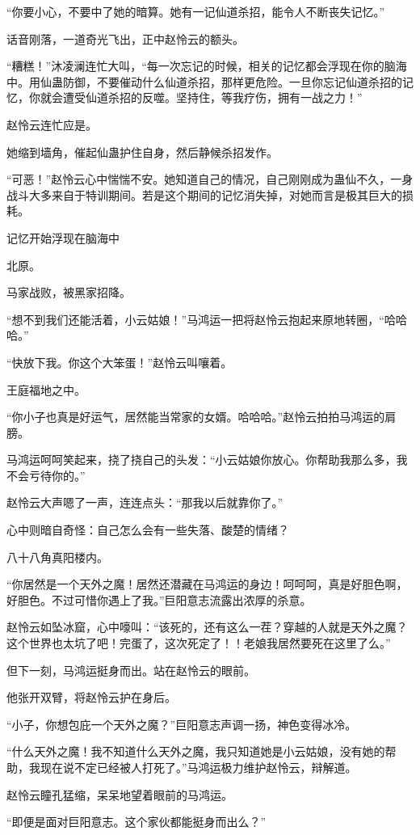 \begin{this_body}
“你要小心，不要中了她的暗算。她有一记仙道杀招，能令人不断丧失记忆。”

话音刚落，一道奇光飞出，正中赵怜云的额头。

“糟糕！”沐凌澜连忙大叫，“每一次忘记的时候，相关的记忆都会浮现在你的脑海中。用仙蛊防御，不要催动什么仙道杀招，那样更危险。一旦你忘记仙道杀招的记忆，你就会遭受仙道杀招的反噬。坚持住，等我疗伤，拥有一战之力！”

赵怜云连忙应是。

她缩到墙角，催起仙蛊护住自身，然后静候杀招发作。

“可恶！”赵怜云心中惴惴不安。她知道自己的情况，自己刚刚成为蛊仙不久，一身战斗大多来自于特训期间。若是这个期间的记忆消失掉，对她而言是极其巨大的损耗。

记忆开始浮现在脑海中

北原。

马家战败，被黑家招降。

“想不到我们还能活着，小云姑娘！”马鸿运一把将赵怜云抱起来原地转圈，“哈哈哈。”

“快放下我。你这个大笨蛋！”赵怜云叫嚷着。

王庭福地之中。

“你小子也真是好运气，居然能当常家的女婿。哈哈哈。”赵怜云拍拍马鸿运的肩膀。

马鸿运呵呵笑起来，挠了挠自己的头发：“小云姑娘你放心。你帮助我那么多，我不会亏待你的。”

赵怜云大声嗯了一声，连连点头：“那我以后就靠你了。”

心中则暗自奇怪：自己怎么会有一些失落、酸楚的情绪？

八十八角真阳楼内。

“你居然是一个天外之魔！居然还潜藏在马鸿运的身边！呵呵呵，真是好胆色啊，好胆色。不过可惜你遇上了我。”巨阳意志流露出浓厚的杀意。

赵怜云如坠冰窟，心中嚎叫：“该死的，还有这么一茬？穿越的人就是天外之魔？这个世界也太坑了吧！完蛋了，这次死定了！！老娘我居然要死在这里了么。”

但下一刻，马鸿运挺身而出。站在赵怜云的眼前。

他张开双臂，将赵怜云护在身后。

“小子，你想包庇一个天外之魔？”巨阳意志声调一扬，神色变得冰冷。

“什么天外之魔！我不知道什么天外之魔，我只知道她是小云姑娘，没有她的帮助，我现在说不定已经被人打死了。”马鸿运极力维护赵怜云，辩解道。

赵怜云瞳孔猛缩，呆呆地望着眼前的马鸿运。

“即便是面对巨阳意志。这个家伙都能挺身而出么？”


\end{this_body}
